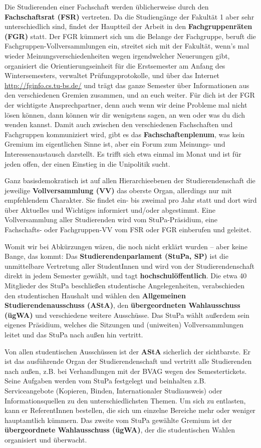 \begin{multicols}{2}
		Die Studierenden einer Fachschaft werden üblicherweise durch den \textbf{Fachschaftsrat (FSR)} vertreten. Da die Studiengänge der Fakultät 1 aber sehr unterschiedlich sind, findet der Hauptteil der Arbeit in den \textbf{Fachgruppenräten (FGR)} statt. Der FGR kümmert sich um die Belange der Fachgruppe, beruft die Fachgruppen-Vollversammlungen ein, streitet sich mit der Fakultät, wenn's mal wieder Meinungsverschiedenheiten wegen irgendwelcher Neuerungen gibt, organisiert die Orientierungseinheit für die Erstsemester am Anfang des Wintersemesters, verwaltet Prüfungsprotokolle, und über das Internet \url{http://fginfo.cs.tu-bs.de/} und trägt das ganze Semester über Informationen aus den verschiedenen Gremien zusammen, und an euch weiter. Für dich ist der FGR der wichtigste Ansprechpartner, denn auch wenn wir deine Probleme mal nicht lösen können, dann können wir dir wenigstens sagen, an wen oder was du dich wenden kannst. Damit auch zwischen den verschiedenen Fachschaften und Fachgruppen kommuniziert wird, gibt es das \textbf{Fachschaftenplenum}, was kein Gremium im eigentlichen Sinne ist, aber ein Forum zum Meinungs- und Interessenaustausch darstellt. Es trifft sich etwa einmal im Monat und ist für jeden offen, der einen Einstieg in die Unipolitik sucht.

		Ganz basisdemokratisch ist auf allen Hierarchie\-ebenen der Studierendenschaft die jeweilige \textbf{Vollversammlung (VV)} das oberste Organ, allerdings nur mit empfehlendem Charakter. Sie findet ein- bis zweimal pro Jahr statt und dort wird über Aktuelles und Wichtiges informiert und/oder abgestimmt. Eine Vollversammlung aller Studierenden wird vom StuPa-Präsidium, eine Fachschafts- oder Fachgruppen-VV vom FSR oder FGR einberufen und geleitet.

		Womit wir bei Abkürzungen wären, die noch nicht erklärt wurden -- aber keine Bange, das kommt: Das \textbf{Studierendenparlament (StuPa, SP)} ist die unmittelbare Vertretung aller StudentInnen und wird von der Studierendenschaft direkt in jedem Semester gewählt, und tagt \textbf{hochschulöffentlich}. Die etwa 40 Mitglieder des StuPa beschließen studentische Angelegenheiten, verabschieden den studentischen Haushalt und wählen den \textbf{Allgemeinen Studierendenausschuss (AStA)}, den \textbf{übergeordneten Wahlausschuss (ügWA)} und verschiedene weitere Ausschüsse. Das StuPa wählt außerdem sein eigenes Präsidium, welches die Sitzungen und (uniweiten) Vollversammlungen leitet und das StuPa nach außen hin vertritt.

		Von allen studentischen Ausschüssen ist der \textbf{AStA} sicherlich der sichtbarste. Er ist das ausführende Organ der Studierendenschaft und vertritt alle Studierenden nach außen, z.B. bei Verhandlungen mit der BVAG wegen des Semestertickets. Seine Aufgaben werden vom StuPa festgelegt und beinhalten z.B. Serviceangebote (Kopieren, Binden, Internationaler Studiausweis) oder Informationsquellen zu den unterschiedlichsten Themen. Um sich zu entlasten, kann er ReferentInnen bestellen, die sich um einzelne Bereiche mehr oder weniger hauptamtlich kümmern. Das zweite vom StuPa gewählte Gremium ist der \textbf{übergeordnete Wahlausschuss (ügWA)}, der die studentischen Wahlen organisiert und überwacht.


\end{multicols}
